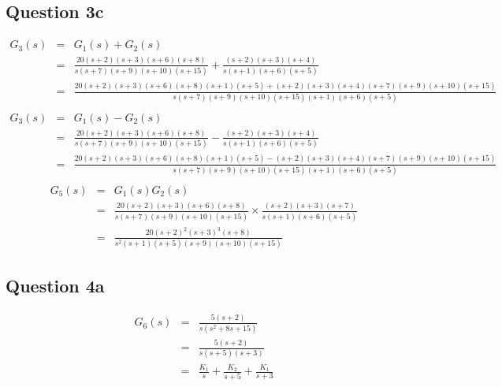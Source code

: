 \documentclass[12pt, a4paper]{article}
\begin{document}
		\subsection*{Question 3c}
		\label{sub:question_3c}
		\begin{equation}
			\begin{array}{rcl}
				G_3(s) & = & G_1(s)+G_2(s)\\
				& = & \frac{20(s+2)(s+3)(s+6)(s+8)}{s(s+7)(s+9)(s+10)(s+15)} + \frac{(s+2)(s+3)(s+4)}{s(s+1)(s+6)(s+5)}\\
				& = & \frac{20(s+2)(s+3)(s+6)(s+8)(s+1)(s+5)+(s+2)(s+3)(s+4)(s+7)(s+9)(s+10)(s+15)}{s(s+7)(s+9)(s+10)(s+15)(s+1)(s+6)(s+5)}\\
			\end{array}
		\end{equation}
		\begin{equation}
			\begin{array}{rcl}
				G_3(s) & = & G_1(s)-G_2(s)\\
				& = & \frac{20(s+2)(s+3)(s+6)(s+8)}{s(s+7)(s+9)(s+10)(s+15)} - \frac{(s+2)(s+3)(s+4)}{s(s+1)(s+6)(s+5)}\\
				& = & \frac{20(s+2)(s+3)(s+6)(s+8)(s+1)(s+5)-(s+2)(s+3)(s+4)(s+7)(s+9)(s+10)(s+15)}{s(s+7)(s+9)(s+10)(s+15)(s+1)(s+6)(s+5)}\\
			\end{array}
		\end{equation}
		\begin{equation}
			\begin{array}{rcl}
				G_5(s) & = & G_1(s)G_2(s)\\
				& = & \frac{20(s+2)(s+3)(s+6)(s+8)}{s(s+7)(s+9)(s+10)(s+15)}{} \times \frac{(s+2)(s+3)(s+7)}{s(s+1)(s+6)(s+5)}\\
				& = & \frac{20(s+2)^2(s+3)^3(s+8)}{s^2(s+1)(s+5)(s+9)(s+10)(s+15)}
			\end{array}
		\end{equation}

	\subsection*{Question 4a}
		\label{sub:question_4a}
		\begin{equation}
			\begin{array}{rcl}
				G_6(s) & = & \frac{5(s+2)}{s(s^2+8s+15)}\\
				& = & \frac{5(s+2)}{s(s+5)(s+3)}\\
				& = & \frac{K_1}{s} + \frac{K_2}{s+5} + \frac{K_1}{s+3}
			\end{array}
		\end{equation}
\end{document}
